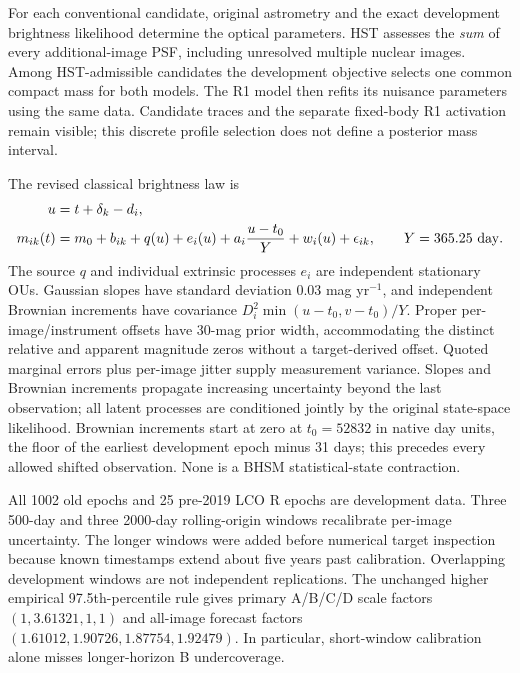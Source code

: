 For each conventional candidate, original astrometry and the exact
development brightness likelihood determine the optical parameters.
HST assesses the \emph{sum} of every additional-image PSF, including
unresolved multiple nuclear images. Among HST-admissible candidates the
development objective selects one common compact mass for both models.
The R1 model then refits its nuisance parameters using the same data.
Candidate traces and the separate fixed-body R1 activation remain visible;
this discrete profile selection does not define a posterior mass interval.

The revised classical brightness law is
\begin{align}
 u&=t+\delta_k-d_i,\nonumber\\
 m_{ik}(t)&=m_0+b_{ik}+q(u)+e_i(u)
             +a_i\frac{u-t_0}{Y}+w_i(u)+\epsilon_{ik},
 \qquad Y=365.25\ {\rm day}.
 \label{eq:revision-brightness}
\end{align}
The source $q$ and individual extrinsic processes $e_i$ are independent
stationary OUs. Gaussian slopes have standard deviation
$0.03$ mag yr$^{-1}$, and independent Brownian increments have covariance
$D_i^2\min(u-t_0,v-t_0)/Y$. Proper per-image/instrument offsets have
30-mag prior width, accommodating the distinct relative and apparent
magnitude zeros without a target-derived offset. Quoted marginal errors
plus per-image jitter supply measurement variance. Slopes and Brownian
increments propagate increasing uncertainty beyond the last observation;
all latent processes are conditioned jointly by the original state-space
likelihood. Brownian increments start at zero at $t_0=52832$ in native day
units, the floor of the earliest development epoch minus 31 days; this
precedes every allowed shifted observation. None is a BHSM statistical-state contraction.

All 1002 old epochs and 25 pre-2019 LCO R epochs are development data.
Three 500-day and three 2000-day rolling-origin windows recalibrate
per-image uncertainty. The longer windows were added before numerical
target inspection because known timestamps extend about five years past
calibration. Overlapping development windows are not independent
replications. The unchanged higher empirical 97.5th-percentile rule gives
primary A/B/C/D scale factors $(1,3.61321,1,1)$ and all-image forecast
factors $(1.61012,1.90726,1.87754,1.92479)$. In particular, short-window
calibration alone misses longer-horizon B undercoverage.

